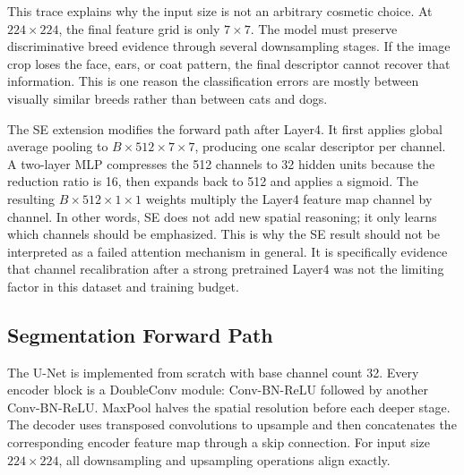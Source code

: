 \documentclass[10pt,twocolumn]{article}
\begin{document}
This trace explains why the input size is not an arbitrary cosmetic choice. At $224\times224$, the final feature grid is only $7\times7$. The model must preserve discriminative breed evidence through several downsampling stages. If the image crop loses the face, ears, or coat pattern, the final descriptor cannot recover that information. This is one reason the classification errors are mostly between visually similar breeds rather than between cats and dogs.

The SE extension modifies the forward path after Layer4. It first applies global average pooling to $B\times512\times7\times7$, producing one scalar descriptor per channel. A two-layer MLP compresses the 512 channels to 32 hidden units because the reduction ratio is 16, then expands back to 512 and applies a sigmoid. The resulting $B\times512\times1\times1$ weights multiply the Layer4 feature map channel by channel. In other words, SE does not add new spatial reasoning; it only learns which channels should be emphasized. This is why the SE result should not be interpreted as a failed attention mechanism in general. It is specifically evidence that channel recalibration after a strong pretrained Layer4 was not the limiting factor in this dataset and training budget.

\subsection{Segmentation Forward Path}

The U-Net is implemented from scratch with base channel count 32. Every encoder block is a DoubleConv module: Conv-BN-ReLU followed by another Conv-BN-ReLU. MaxPool halves the spatial resolution before each deeper stage. The decoder uses transposed convolutions to upsample and then concatenates the corresponding encoder feature map through a skip connection. For input size $224\times224$, all downsampling and upsampling operations align exactly.
\end{document}
